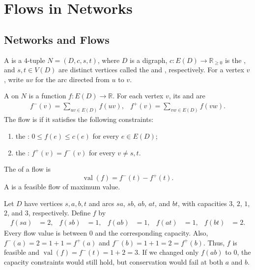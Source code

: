\section{Flows in Networks}\label{sec:FlowsNetworks}

\subsection{Networks and Flows}\label{subsec:NetworksFlows}

A  is a $4$-tuple $N=(D,c,s,t)$, where $D$ is a digraph, $c\colon E(D)\to\mathbb R_{\ge 0}$ is the , and $s,t\in V(D)$ are distinct vertices called the  and , respectively. For a vertex $v$, write $uv$ for the arc directed from $u$ to $v$.

A  on $N$ is a function $f \colon E(D) \to \mathbb R$. For each vertex $v$, its  and  are
\begin{align*}
f^-(v) = \sum_{uv\in E(D)}f(uv), & f^+(v) = \sum_{vw \in E(D)}f(vw).
\end{align*}
The flow is  if it satisfies the following constraints:
\begin{enumerate}[label=(\roman*)]
\item the : $0\le f(e) \le c(e)$ for every $e \in E(D)$;
\item the : $f^+(v) = f^-(v)$ for every $v \ne s,t$.
\end{enumerate}
The  of a flow is
\begin{equation*}
\operatorname{val}(f) = f^-(t) - f^+(t).
\end{equation*}
A  is a feasible flow of maximum value.

\begin{Example}\label{ex:FeasibleFlow}
Let $D$ have vertices $s,a,b,t$ and arcs $sa$, $sb$, $ab$, $at$, and $bt$, with capacities $3$, $2$, $1$, $2$, and $3$, respectively. Define $f$ by
\begin{align*}
f(sa) &= 2, & f(sb) &= 1, & f(ab) &= 1, & f(at) &= 1, & f(bt) &= 2.
\end{align*}
Every flow value is between $0$ and the corresponding capacity. Also, $f^-(a) = 2 = 1 + 1 = f^+(a)$ and $f^-(b) = 1 + 1 = 2 = f^+(b)$. Thus, $f$ is feasible and $\operatorname{val}(f) = f^-(t) = 1 + 2 = 3$. If we changed only $f(ab)$ to $0$, the capacity constraints would still hold, but conservation would fail at both $a$ and $b$.
\end{Example}

